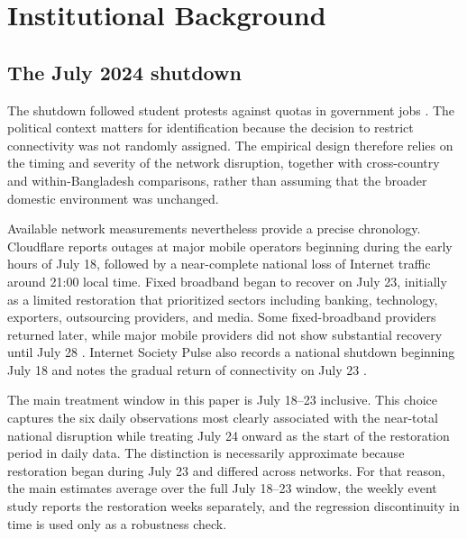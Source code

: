 \section{Institutional Background}
\label{sec:background}

\subsection{The July 2024 shutdown}
\label{sec:shutdown}

The shutdown followed student protests against quotas in government jobs \citep{belson2024}.
The political context matters for identification because the decision to restrict connectivity was not randomly assigned. The empirical design therefore relies on the timing and severity of the network disruption, together with cross-country and within-Bangladesh comparisons, rather than assuming that the broader domestic environment was unchanged.

Available network measurements nevertheless provide a precise chronology. Cloudflare reports outages at major mobile operators beginning during the early hours of July 18, followed by a near-complete national loss of Internet traffic around 21:00 local time. Fixed broadband began to recover on July 23, initially as a limited restoration that prioritized sectors including banking, technology, exporters, outsourcing providers, and media. Some fixed-broadband providers returned later, while major mobile providers did not show substantial recovery until July 28 \citep{belson2024}. Internet Society Pulse also records a national shutdown beginning July 18 and notes the gradual return of connectivity on July 23 \citep{isoc2024}.

The main treatment window in this paper is July 18--23 inclusive. This choice captures the six daily observations most clearly associated with the near-total national disruption while treating July 24 onward as the start of the restoration period in daily data. The distinction is necessarily approximate because restoration began during July 23 and differed across networks. For that reason, the main estimates average over the full July 18--23 window, the weekly event study reports the restoration weeks separately, and the regression discontinuity in time is used only as a robustness check.

